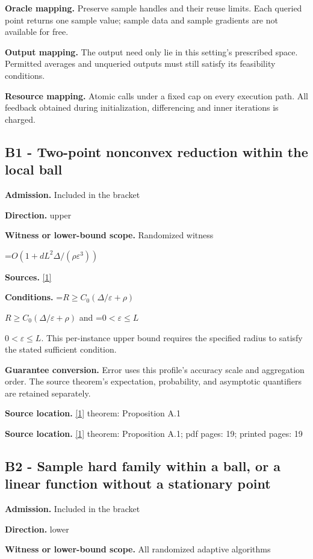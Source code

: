 \documentclass[10pt,a4paper]{article}
\newcommand{\AtlasMath}[1]{\par\begingroup\centering\setbox0=\hbox{$\displaystyle #1$}\ifdim\wd0>1.4\linewidth\typeout{ATLAS WIDE FORMULA: \the\wd0}\fi\ifdim\wd0>\linewidth\resizebox{\linewidth}{!}{\box0}\else\box0\fi\par\endgroup}
\newcommand{\AtlasInlineMath}[1]{\begingroup\setbox0=\hbox{$#1$}\ifdim\wd0>.4\linewidth\endgroup\AtlasMath{#1}\else\endgroup$#1$\fi}
\begin{document}
\textbf{Oracle mapping.} Preserve sample handles and their reuse limits. Each queried point returns one sample value; sample data and sample gradients are not available for free.

\textbf{Output mapping.} The output need only lie in this setting's prescribed space. Permitted averages and unqueried outputs must still satisfy its feasibility conditions.

\textbf{Resource mapping.} Atomic calls under a fixed cap on every execution path. All feedback obtained during initialization, differencing and inner iterations is charged.

\subsection{B1 - Two-point nonconvex reduction within the local ball}
\textbf{Admission.} Included in the bracket

\textbf{Direction.} upper

\textbf{Witness or lower-bound scope.} Randomized witness

\AtlasMath{O(1+dL^2\Delta/(\rho\varepsilon^3))}
\textbf{Sources.} \href{https://arxiv.org/html/2610.00275v2}{[1]}

\textbf{Conditions.} \AtlasInlineMath{R\ge C_0(\Delta/\varepsilon+\rho)} and \AtlasInlineMath{0<\varepsilon\le L}. This per-instance upper bound requires the specified radius to satisfy the stated sufficient condition.

\textbf{Guarantee conversion.} Error uses this profile's accuracy scale and aggregation order. The source theorem's expectation, probability, and asymptotic quantifiers are retained separately.

\textbf{Source location.} \href{https://arxiv.org/html/2610.00275v2}{[1]} theorem: Proposition A.1

\textbf{Source location.} \href{https://arxiv.org/html/2610.00275v2}{[1]} theorem: Proposition A.1; pdf pages: 19; printed pages: 19

\subsection{B2 - Sample hard family within a ball, or a linear function without a stationary point}
\textbf{Admission.} Included in the bracket

\textbf{Direction.} lower

\textbf{Witness or lower-bound scope.} All randomized adaptive algorithms
\end{document}
